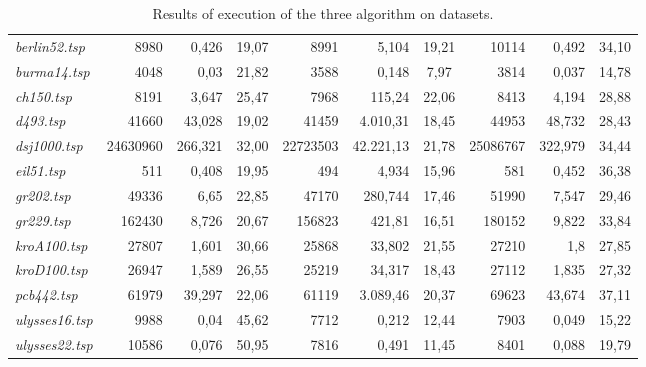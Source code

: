 \begin{landscape}
\begin{table}[]
\begin{tabular}{|l|r|r|c|r|r|c|r|r|c|}
    \textit{berlin52.tsp}	& 8980	    & 0,426	    & 19,07 	& 8991	    & 5,104	    & 19,21 	& 10114	    & 0,492	    & 34,10 \\
    \textit{burma14.tsp}	& 4048	    & 0,03	    & 21,82 	& 3588	    & 0,148	    & 7,97      & 3814	    & 0,037	    & 14,78 \\
    \textit{ch150.tsp}	    & 8191	    & 3,647	    & 25,47 	& 7968	    & 115,24	& 22,06 	& 8413	    & 4,194 	& 28,88 \\
    \textit{d493.tsp}	    & 41660	    & 43,028	& 19,02 	& 41459	    & 4.010,31	& 18,45 	& 44953	    & 48,732	& 28,43 \\
    \textit{dsj1000.tsp}	& 24630960	& 266,321	& 32,00 	& 22723503	& 42.221,13	& 21,78 	& 25086767	& 322,979	& 34,44 \\
    \textit{eil51.tsp}	    & 511	    & 0,408	    & 19,95 	& 494	    & 4,934	    & 15,96 	& 581	    & 0,452	    & 36,38 \\
    \textit{gr202.tsp}	    & 49336	    & 6,65  	& 22,85 	& 47170	    & 280,744	& 17,46 	& 51990	    & 7,547 	& 29,46 \\
    \textit{gr229.tsp}	    & 162430	& 8,726 	& 20,67 	& 156823	& 421,81	& 16,51     & 180152	& 9,822 	& 33,84 \\
    \textit{kroA100.tsp}	& 27807	    & 1,601	    & 30,66 	& 25868	    & 33,802	& 21,55 	& 27210	    & 1,8       & 27,85 \\
    \textit{kroD100.tsp}    & 26947	    & 1,589	    & 26,55 	& 25219	    & 34,317	& 18,43 	& 27112	    & 1,835	    & 27,32 \\
    \textit{pcb442.tsp}	    & 61979	    & 39,297	& 22,06 	& 61119	    & 3.089,46	& 20,37 	& 69623	    & 43,674	& 37,11 \\
    \textit{ulysses16.tsp}	& 9988	    & 0,04	    & 45,62 	& 7712	    & 0,212	    & 12,44 	& 7903	    & 0,049	    & 15,22 \\
    \textit{ulysses22.tsp}	& 10586	    & 0,076	    & 50,95     & 7816	    & 0,491	    & 11,45     & 8401	    & 0,088	    & 19,79 \\

    \hline
    \end{tabular}
    \caption{Results of execution of the three algorithm on datasets.}
\end{table}
\end{landscape}

